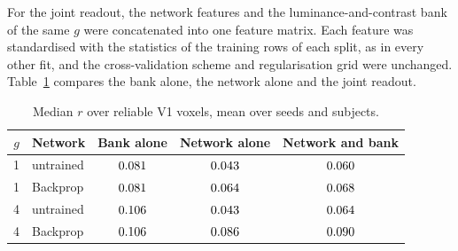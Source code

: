 For the joint readout, the network features and the luminance-and-contrast bank of the same
$g$ were concatenated into one feature matrix. Each feature was standardised with the
statistics of the training rows of each split, as in every other fit, and the cross-validation
scheme and regularisation grid were unchanged. Table~\ref{tab:joint} compares the bank alone,
the network alone and the joint readout.

\begin{table}[h]
\centering
\footnotesize
\setlength{\tabcolsep}{3pt}
\begin{tabular}{@{}clccc@{}}
\toprule
$g$ & Network & Bank alone & Network alone & Network and bank \\
\midrule
1 & untrained & $0.081$ & $0.043$ & $0.060$ \\
1 & Backprop & $0.081$ & $0.064$ & $0.068$ \\
4 & untrained & $0.106$ & $0.043$ & $0.064$ \\
4 & Backprop & $0.106$ & $0.086$ & $0.090$ \\
\bottomrule
\end{tabular}
\caption{Median $r$ over reliable V1 voxels, mean over seeds and subjects.}
\label{tab:joint}
\end{table}
